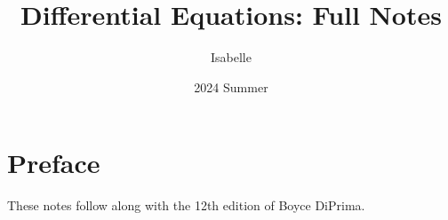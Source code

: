 \documentclass{article}
\title{Differential Equations: Full Notes}
\author{Isabelle}
\date{2024 Summer}
\begin{document}
\maketitle 
\newpage
\tableofcontents
\newpage

\section*{Preface}
These notes follow along with the 12th edition of Boyce DiPrima. 




\end{document}
